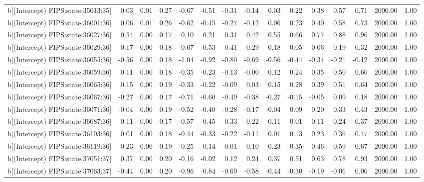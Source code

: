\begin{table}[ht]
\begin{tabular}{rrrrrrrrrrrrrrr}
  b[(Intercept) FIPS:state:35013:35] & 0.03 & 0.01 & 0.27 & -0.67 & -0.51 & -0.31 & -0.14 & 0.03 & 0.22 & 0.38 & 0.57 & 0.71 & 2000.00 & 1.00 \\ 
  b[(Intercept) FIPS:state:36001:36] & 0.06 & 0.01 & 0.26 & -0.62 & -0.45 & -0.27 & -0.12 & 0.06 & 0.23 & 0.40 & 0.58 & 0.73 & 2000.00 & 1.00 \\ 
  b[(Intercept) FIPS:state:36027:36] & 0.54 & 0.00 & 0.17 & 0.10 & 0.21 & 0.31 & 0.42 & 0.55 & 0.66 & 0.77 & 0.88 & 0.96 & 2000.00 & 1.00 \\ 
  b[(Intercept) FIPS:state:36029:36] & -0.17 & 0.00 & 0.18 & -0.67 & -0.53 & -0.41 & -0.29 & -0.18 & -0.05 & 0.06 & 0.19 & 0.32 & 2000.00 & 1.00 \\ 
  b[(Intercept) FIPS:state:36055:36] & -0.56 & 0.00 & 0.18 & -1.04 & -0.92 & -0.80 & -0.69 & -0.56 & -0.44 & -0.34 & -0.21 & -0.12 & 2000.00 & 1.00 \\ 
  b[(Intercept) FIPS:state:36059:36] & 0.11 & 0.00 & 0.18 & -0.35 & -0.23 & -0.13 & -0.00 & 0.12 & 0.24 & 0.35 & 0.50 & 0.60 & 2000.00 & 1.00 \\ 
  b[(Intercept) FIPS:state:36065:36] & 0.15 & 0.00 & 0.19 & -0.33 & -0.22 & -0.09 & 0.03 & 0.15 & 0.28 & 0.39 & 0.51 & 0.64 & 2000.00 & 1.00 \\ 
  b[(Intercept) FIPS:state:36067:36] & -0.27 & 0.00 & 0.17 & -0.71 & -0.60 & -0.49 & -0.38 & -0.27 & -0.15 & -0.05 & 0.09 & 0.18 & 2000.00 & 1.00 \\ 
  b[(Intercept) FIPS:state:36071:36] & -0.04 & 0.00 & 0.19 & -0.52 & -0.40 & -0.28 & -0.17 & -0.04 & 0.09 & 0.20 & 0.33 & 0.43 & 2000.00 & 1.00 \\ 
  b[(Intercept) FIPS:state:36087:36] & -0.11 & 0.00 & 0.17 & -0.57 & -0.45 & -0.33 & -0.22 & -0.11 & 0.01 & 0.11 & 0.24 & 0.37 & 2000.00 & 1.00 \\ 
  b[(Intercept) FIPS:state:36103:36] & 0.01 & 0.00 & 0.18 & -0.44 & -0.33 & -0.22 & -0.11 & 0.01 & 0.13 & 0.23 & 0.36 & 0.47 & 2000.00 & 1.00 \\ 
  b[(Intercept) FIPS:state:36119:36] & 0.23 & 0.00 & 0.19 & -0.25 & -0.14 & -0.01 & 0.10 & 0.23 & 0.35 & 0.46 & 0.59 & 0.67 & 2000.00 & 1.00 \\ 
  b[(Intercept) FIPS:state:37051:37] & 0.37 & 0.00 & 0.20 & -0.16 & -0.02 & 0.12 & 0.24 & 0.37 & 0.51 & 0.63 & 0.78 & 0.93 & 2000.00 & 1.00 \\ 
  b[(Intercept) FIPS:state:37063:37] & -0.44 & 0.00 & 0.20 & -0.96 & -0.84 & -0.69 & -0.58 & -0.44 & -0.30 & -0.19 & -0.06 & 0.06 & 2000.00 & 1.00 \\ 

\end{tabular}
\end{table}
